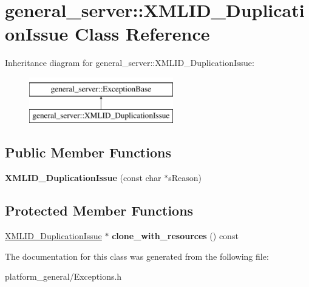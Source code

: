 \hypertarget{classgeneral__server_1_1XMLID__DuplicationIssue}{\section{general\-\_\-server\-:\-:\-X\-M\-L\-I\-D\-\_\-\-Duplication\-Issue \-Class \-Reference}
\label{classgeneral__server_1_1XMLID__DuplicationIssue}
}
\-Inheritance diagram for general\-\_\-server\-:\-:\-X\-M\-L\-I\-D\-\_\-\-Duplication\-Issue\-:\begin{figure}[H]
\begin{center}
\leavevmode
\includegraphics[height=2.000000cm]{classgeneral__server_1_1XMLID__DuplicationIssue}
\end{center}
\end{figure}
\subsection*{\-Public \-Member \-Functions}
\begin{DoxyCompactItemize}
\item 
\hypertarget{classgeneral__server_1_1XMLID__DuplicationIssue_a1df101e8a1b35f83ce67d3fae94d7a4a}{{\bfseries \-X\-M\-L\-I\-D\-\_\-\-Duplication\-Issue} (const char $\ast$s\-Reason)}\label{classgeneral__server_1_1XMLID__DuplicationIssue_a1df101e8a1b35f83ce67d3fae94d7a4a}

\end{DoxyCompactItemize}
\subsection*{\-Protected \-Member \-Functions}
\begin{DoxyCompactItemize}
\item 
\hypertarget{classgeneral__server_1_1XMLID__DuplicationIssue_abc130e5095017a904933299eeb007625}{\hyperlink{classgeneral__server_1_1XMLID__DuplicationIssue}{\-X\-M\-L\-I\-D\-\_\-\-Duplication\-Issue} $\ast$ {\bfseries clone\-\_\-with\-\_\-resources} () const }\label{classgeneral__server_1_1XMLID__DuplicationIssue_abc130e5095017a904933299eeb007625}

\end{DoxyCompactItemize}


\-The documentation for this class was generated from the following file\-:\begin{DoxyCompactItemize}
\item 
platform\-\_\-general/\-Exceptions.\-h\end{DoxyCompactItemize}
